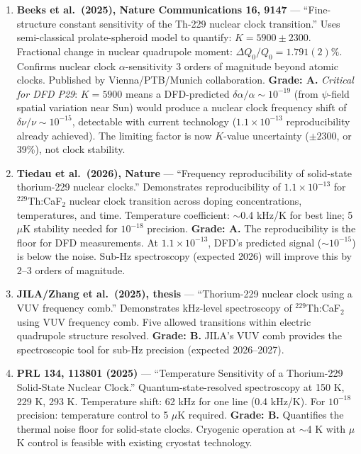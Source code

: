 \documentclass[11pt,a4paper]{article}
\begin{document}
\begin{enumerate}

\item \textbf{Beeks et al.\ (2025), Nature Communications 16, 9147} --- ``Fine-structure constant sensitivity of the Th-229 nuclear clock transition.'' Uses semi-classical prolate-spheroid model to quantify: $K = 5900 \pm 2300$. Fractional change in nuclear quadrupole moment: $\Delta Q_0/Q_0 = 1.791(2)\%$. Confirms nuclear clock $\alpha$-sensitivity 3 orders of magnitude beyond atomic clocks. Published by Vienna/PTB/Munich collaboration. \textbf{Grade: A.} \emph{Critical for DFD P29}: $K = 5900$ means a DFD-predicted $\delta\alpha/\alpha \sim 10^{-19}$ (from $\psi$-field spatial variation near Sun) would produce a nuclear clock frequency shift of $\delta\nu/\nu \sim 10^{-15}$, detectable with current technology ($1.1 \times 10^{-13}$ reproducibility already achieved). The limiting factor is now $K$-value uncertainty ($\pm 2300$, or 39\%), not clock stability.

\item \textbf{Tiedau et al.\ (2026), Nature} --- ``Frequency reproducibility of solid-state thorium-229 nuclear clocks.'' Demonstrates reproducibility of $1.1 \times 10^{-13}$ for $^{229}$Th:CaF$_2$ nuclear clock transition across doping concentrations, temperatures, and time. Temperature coefficient: $\sim$0.4 kHz/K for best line; 5 $\mu$K stability needed for $10^{-18}$ precision. \textbf{Grade: A.} The reproducibility is the floor for DFD measurements. At $1.1 \times 10^{-13}$, DFD's predicted signal ($\sim 10^{-15}$) is below the noise. Sub-Hz spectroscopy (expected 2026) will improve this by 2--3 orders of magnitude.

\item \textbf{JILA/Zhang et al.\ (2025), thesis} --- ``Thorium-229 nuclear clock using a VUV frequency comb.'' Demonstrates kHz-level spectroscopy of $^{229}$Th:CaF$_2$ using VUV frequency comb. Five allowed transitions within electric quadrupole structure resolved. \textbf{Grade: B.} JILA's VUV comb provides the spectroscopic tool for sub-Hz precision (expected 2026--2027).

\item \textbf{PRL 134, 113801 (2025)} --- ``Temperature Sensitivity of a Thorium-229 Solid-State Nuclear Clock.'' Quantum-state-resolved spectroscopy at 150 K, 229 K, 293 K. Temperature shift: 62 kHz for one line (0.4 kHz/K). For $10^{-18}$ precision: temperature control to 5 $\mu$K required. \textbf{Grade: B.} Quantifies the thermal noise floor for solid-state clocks. Cryogenic operation at $\sim$4 K with $\mu$K control is feasible with existing cryostat technology.


\end{enumerate}
\end{document}
